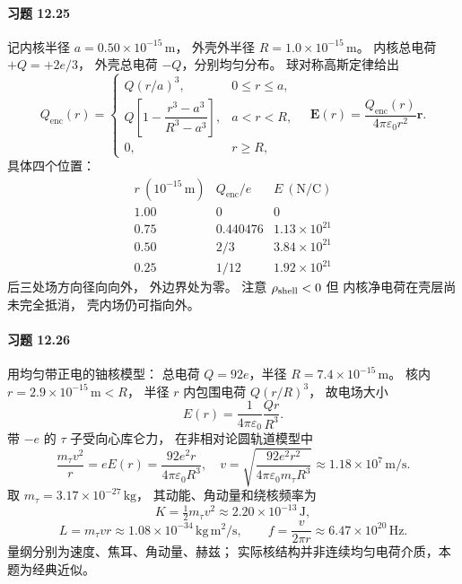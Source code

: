 \paragraph{习题 12.25}
记内核半径
\(a=0.50\times10^{-15}\,\mathrm m\)，
外壳外半径 \(R=1.0\times10^{-15}\,\mathrm m\)。
内核总电荷 \(+Q=+2e/3\)，
外壳总电荷 \(-Q\)，分别均匀分布。
球对称高斯定律给出
\[
 \boxed{Q_{\mathrm{enc}}(r)=
 \begin{cases}
 Q(r/a)^3,&0\le r\le a,\\
 Q\left[1-\dfrac{r^3-a^3}{R^3-a^3}\right],
 &a<r<R,\\
 0,&r\ge R,
 \end{cases}}
\quad
 \boxed{\boldsymbol E(r)=
 \frac{Q_{\mathrm{enc}}(r)}
 {4\pi\varepsilon_0r^2}\hat{\boldsymbol r}}.
\]
具体四个位置：
\[
 \begin{array}{c|c|c}
 r\ (10^{-15}\,\mathrm m)&Q_{\mathrm{enc}}/e&
 E\ (\mathrm{N/C})\\\hline
 1.00&0&0\\
 0.75&0.440476&1.13\times10^{21}\\
 0.50&2/3&3.84\times10^{21}\\
 0.25&1/12&1.92\times10^{21}
 \end{array}
\]
后三处场方向径向向外，
外边界处为零。
注意 \(\rho_{\rm shell}<0\) 但
内核净电荷在壳层尚未完全抵消，
壳内场仍可指向外。

\paragraph{习题 12.26}
用均匀带正电的铀核模型：
总电荷 \(Q=92e\)，半径 \(R=7.4\times10^{-15}\,\mathrm m\)。
核内 \(r=2.9\times10^{-15}\,\mathrm m<R\)，
半径 \(r\) 内包围电荷 \(Q(r/R)^3\)，
故电场大小
\[
 E(r)=\frac{1}{4\pi\varepsilon_0}
 \frac{Qr}{R^3}.
\]
带 \(-e\) 的 \(\tau\) 子受向心库仑力，
在非相对论圆轨道模型中
\[
 \frac{m_\tau v^2}{r}
 =eE(r)=\frac{92e^2r}{4\pi\varepsilon_0R^3},
\quad
 \boxed{v=
 \sqrt{\frac{92e^2r^2}{4\pi\varepsilon_0m_\tau R^3}}}
 \approx1.18\times10^7\,\mathrm{m/s}.
\]
取 \(m_\tau=3.17\times10^{-27}\,\mathrm{kg}\)，
其动能、角动量和绕核频率为
\[
 \boxed{K=\tfrac12m_\tau v^2
 \approx2.20\times10^{-13}\,\mathrm J},
\]
\[
 \boxed{L=m_\tau vr\approx1.08\times10^{-34}\,
 \mathrm{kg\,m^2/s}},\qquad
 \boxed{f=\frac{v}{2\pi r}
 \approx6.47\times10^{20}\,\mathrm{Hz}}.
\]
量纲分别为速度、焦耳、角动量、赫兹；
实际核结构并非连续均匀电荷介质，本题为经典近似。

